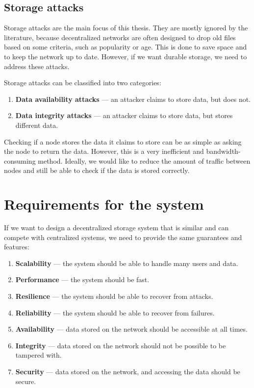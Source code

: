 \subsection{Storage attacks}
\label{section:storage-attacks}

Storage attacks are the main focus of this thesis.
They are mostly ignored by the literature, because decentralized networks are often designed to
drop old files based on some criteria, such as popularity or age.
This is done to save space and to keep the network up to date.
However, if we want durable storage, we need to address these attacks.

Storage attacks can be classified into two categories:
\begin{enumerate}
    \item \textbf{Data availability attacks} --- an attacker claims to store data, but does not.
    \item \textbf{Data integrity attacks} --- an attacker claims to store data, but stores different data.
\end{enumerate}

Checking if a node stores the data it claims to store can be as simple as asking the node to return the data.
However, this is a very inefficient and bandwidth-consuming method.
Ideally, we would like to reduce the amount of traffic between nodes and still be able to check
if the data is stored correctly.

\section{Requirements for the system}

If we want to design a decentralized storage system that is similar and can compete with centralized systems,
we need to provide the same guarantees and features:
\begin{enumerate}
    \item \textbf{Scalability} --- the system should be able to handle many users and data.
    \item \textbf{Performance} --- the system should be fast.
    \item \textbf{Resilience} --- the system should be able to recover from attacks.
    \item \textbf{Reliability} --- the system should be able to recover from failures.
    \item \textbf{Availability} --- data stored on the network should be accessible at all times.
    \item \textbf{Integrity} --- data stored on the network should not be possible to be tampered with.
    \item \textbf{Security} --- data stored on the network, and accessing the data should be secure.
\end{enumerate}

